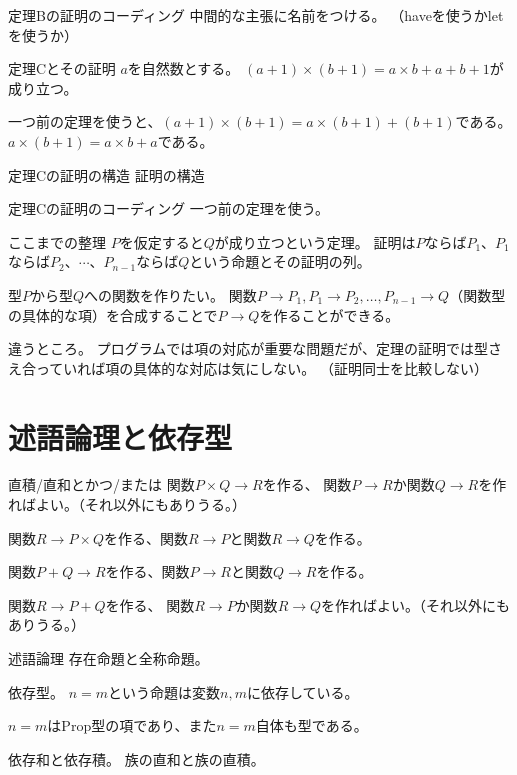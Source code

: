 \documentclass[unicode,12pt]{beamer}%
\begin{document}
\begin{frame}{定理Bの証明のコーディング}
  中間的な主張に名前をつける。
  （haveを使うかletを使うか）
\end{frame}

\begin{frame}{定理Cとその証明}
  $a$を自然数とする。
  $(a+1)\times(b+1)=a\times b+a+b+1$が成り立つ。

  一つ前の定理を使うと、$(a+1)\times(b+1)=a\times(b+1)+(b+1)$である。
  $a\times(b+1)=a\times b+a$である。
\end{frame}

\begin{frame}{定理Cの証明の構造}
  証明の構造
\end{frame}

\begin{frame}{定理Cの証明のコーディング}
  一つ前の定理を使う。
\end{frame}

\begin{frame}{ここまでの整理}
  $P$を仮定すると$Q$が成り立つという定理。
  証明は$P$ならば$P_1$、$P_1$ならば$P_2$、$\cdots$、$P_{n-1}$ならば$Q$という命題とその証明の列。

  型$P$から型$Q$への関数を作りたい。
  関数$P\to P_1, P_1\to P_2,\ldots, P_{n-1}\to Q$（関数型の具体的な項）を合成することで$P\to Q$を作ることができる。

  違うところ。
  プログラムでは項の対応が重要な問題だが、定理の証明では型さえ合っていれば項の具体的な対応は気にしない。
  （証明同士を比較しない）
\end{frame}

\section{述語論理と依存型}

\begin{frame}{直積/直和とかつ/または}
  関数$P \times Q\to R$を作る、
  関数$P\to R$か関数$Q\to R$を作ればよい。（それ以外にもありうる。）

  関数$R\to P\times Q$を作る、関数$R\to P$と関数$R\to Q$を作る。

  関数$P+Q\to R$を作る、関数$P\to R$と関数$Q\to R$を作る。

  関数$R\to P+Q$を作る、
  関数$R\to P$か関数$R\to Q$を作ればよい。（それ以外にもありうる。）
\end{frame}

\begin{frame}{述語論理}
  存在命題と全称命題。

  依存型。
  $n=m$という命題は変数$n, m$に依存している。    

  $n=m$はProp型の項であり、また$n=m$自体も型である。

  依存和と依存積。
  族の直和と族の直積。
\end{frame}
\end{document}
